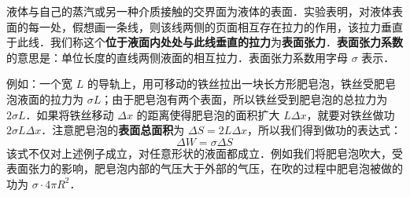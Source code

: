 
液体与自己的蒸汽或另一种介质接触的交界面为液体的表面．实验表明，对液体表面的每一处，假想画一条线，则该线两侧的页面相互存在拉力的作用，该拉力垂直于此线．我们称这个\textbf{位于液面内处处与此线垂直的拉力}为\textbf{表面张力}．\textbf{表面张力系数} 的意思是：单位长度的直线两侧液面的相互拉力．表面张力系数用字母 $\sigma$ 表示．

例如：一个宽 $L$ 的导轨上，用可移动的铁丝拉出一块长方形肥皂泡，铁丝受肥皂泡液面的拉力为 $\sigma L$；由于肥皂泡有两个表面，所以铁丝受到肥皂泡的总拉力为 $2\sigma L$．如果将铁丝移动 $\Delta x$ 的距离使得肥皂泡的面积扩大 $L\Delta x$，就要对铁丝做功 $2\sigma L\Delta x$．注意肥皂泡的\textbf{表面总面积}为 $\Delta S=2 L \Delta x$，所以我们得到做功的表达式：
\begin{equation}
\Delta W=\sigma \Delta S
\end{equation}
该式不仅对上述例子成立，对任意形状的液面都成立．例如我们将肥皂泡吹大，受表面张力的影响，肥皂泡内部的气压大于外部的气压，在吹的过程中肥皂泡被做的功为 $\sigma\cdot 4\pi R^2$．
